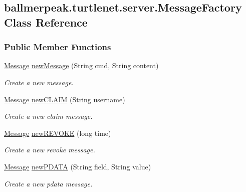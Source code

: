 \hypertarget{classballmerpeak_1_1turtlenet_1_1server_1_1MessageFactory}{\subsection{ballmerpeak.\-turtlenet.\-server.\-Message\-Factory Class Reference}
\label{classballmerpeak_1_1turtlenet_1_1server_1_1MessageFactory}
}
\subsubsection*{Public Member Functions}
\begin{DoxyCompactItemize}
\item 
\hyperlink{classballmerpeak_1_1turtlenet_1_1shared_1_1Message}{Message} \hyperlink{classballmerpeak_1_1turtlenet_1_1server_1_1MessageFactory_a7002eaa445dc787d9f48c522e3c4d38f}{new\-Message} (String cmd, String content)
\begin{DoxyCompactList}\small\item\em Create a new message. \end{DoxyCompactList}\item 
\hyperlink{classballmerpeak_1_1turtlenet_1_1shared_1_1Message}{Message} \hyperlink{classballmerpeak_1_1turtlenet_1_1server_1_1MessageFactory_a96cb2d8fa129ec51603a53f0bffd821d}{new\-C\-L\-A\-I\-M} (String username)
\begin{DoxyCompactList}\small\item\em Create a new claim message. \end{DoxyCompactList}\item 
\hyperlink{classballmerpeak_1_1turtlenet_1_1shared_1_1Message}{Message} \hyperlink{classballmerpeak_1_1turtlenet_1_1server_1_1MessageFactory_aef6d14c4ca6c13776d25fa525c1f39fc}{new\-R\-E\-V\-O\-K\-E} (long time)
\begin{DoxyCompactList}\small\item\em Create a new revoke message. \end{DoxyCompactList}\item 
\hyperlink{classballmerpeak_1_1turtlenet_1_1shared_1_1Message}{Message} \hyperlink{classballmerpeak_1_1turtlenet_1_1server_1_1MessageFactory_a46db634da1ffe850a4066cae406db0cd}{new\-P\-D\-A\-T\-A} (String field, String value)
\begin{DoxyCompactList}\small\item\em Create a new pdata message. \end{DoxyCompactList}\item 

\end{DoxyCompactItemize}
